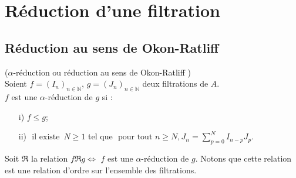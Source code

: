 \section{Réduction d'une filtration}
\subsection{Réduction au sens de Okon-Ratliff}
\begin{madefinition}
	($\alpha$-réduction ou réduction au sens de Okon-Ratliff\cite{Ok} )\\
	Soient $f=(I_n)_{n \in \mathbb{N}}$, $g=(J_n)_{n \in \mathbb{N}}$ deux filtrations de $A$.\\
	$f$ est une $\alpha$-réduction de $g$ si :
	\begin{enumerate}
		\item[i)] $f \leq g$;
		\item[ii)] $\text{ il existe } \, N \geq 1$ tel que $\text{ pour tout } n \geq N , J_n = \displaystyle \sum_{p=0}^{N}{I_{n-p} J_p}$.
	\end{enumerate}
\end{madefinition}
\begin{maremarque}
	Soit $\Re$ la relation $f \Re g \Leftrightarrow$ $f$ est une $\alpha$-réduction de $g$. Notons que cette relation est une relation d'ordre sur l'ensemble des filtrations.	
\end{maremarque}
